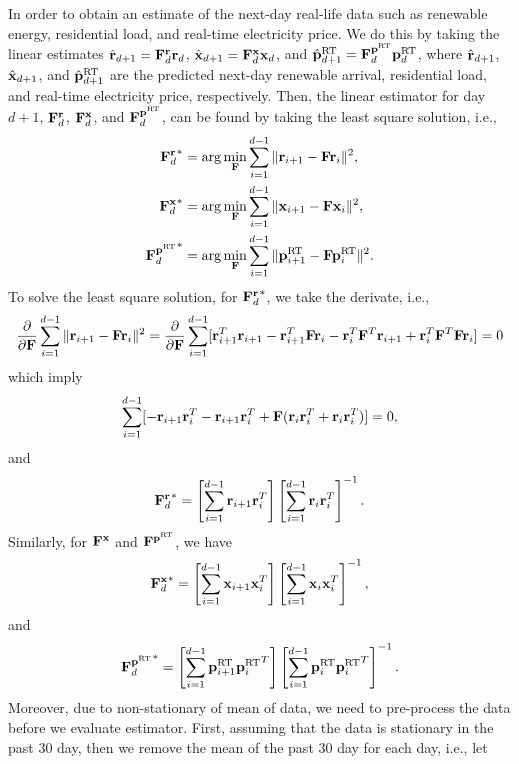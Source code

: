 In order to obtain an estimate of the next-day real-life data such as renewable energy, residential load, and real-time electricity price. We do this by taking the linear estimates $\hat{{\mathbf r}}_{d+1}={\mathbf F}^{{\mathbf r}}_d{\mathbf r}_d$, $\hat{{\mathbf x}}_{d+1}={\mathbf F}^{{\mathbf x}}_d{\mathbf x}_d$, and $\hat{{\mathbf p}}^{\text{RT}}_{d+1}={\mathbf F}^{{\mathbf p}^{\text{RT}}}_d{\mathbf p}^{\text{RT}}_d$, where $\hat{{\mathbf r}}_{d+1}$, $\hat{{\mathbf x}}_{d+1}$, and $\hat{{\mathbf p}}^{\text{RT}}_{d+1}$ are the predicted next-day renewable arrival, residential load, and real-time electricity price, respectively. Then, the linear estimator for day $d+1$, ${\mathbf F}^{\mathbf r}_d$, ${\mathbf F}^{\mathbf x}_d$, and ${\mathbf F}^{{\mathbf p}^{\text{RT}}}_d$, can be found by taking the least square solution, i.e.,
\begin{align}
    {{\mathbf F}^{\mathbf r}_d}^* &= \arg\min_{{\mathbf F}} \sum_{i=1}^{d-1} \|{\mathbf r}_{i+1} - {\mathbf F} {\mathbf r}_{i}\|^2, \\
    {{\mathbf F}^{\mathbf x}_d}^* &= \arg\min_{{\mathbf F}} \sum_{i=1}^{d-1} \|{\mathbf x}_{i+1} - {\mathbf F} {\mathbf x}_{i}\|^2, \\
    {{\mathbf F}^{{\mathbf p}^{\text{RT}}}_d}^* &= \arg\min_{{\mathbf F}} \sum_{i=1}^{d-1} \|{\mathbf p}^{\text{RT}}_{i+1} - {\mathbf F} {\mathbf p}^{\text{RT}}_{i}\|^2.
\end{align}
To solve the least square solution, for ${{\mathbf F}^{\mathbf r}_d}^*$, we take the derivate, i.e.,
\begin{equation}
    \frac{\partial}{\partial {\mathbf F}} \sum_{i=1}^{d-1} \|{\mathbf r}_{i+1} - {\mathbf F} {\mathbf r}_i\|^2 = \frac{\partial}{\partial {\mathbf F}} \sum_{i=1}^{d-1} [{\mathbf r}_{i+1}^T{\mathbf r}_{i+1} - {\mathbf r}_{i+1}^T{\mathbf F}{\mathbf r}_i - {\mathbf r}_i^T{\mathbf F}^T{\mathbf r}_{i+1} + {\mathbf r}_i^T{\mathbf F}^T{\mathbf F}{\mathbf r}_i] = 0
\end{equation}
which imply
\begin{equation}
    \sum_{i=1}^{d-1}[-{\mathbf r}_{i+1}{\mathbf r}_i^T-{\mathbf r}_{i+1}{\mathbf r}_i^T + {\mathbf F}({\mathbf r}_i {\mathbf r}_i^T+{\mathbf r}_i {\mathbf r}_i^T)] = 0,
\end{equation}
and
\begin{equation}
    {{\mathbf F}^{\mathbf r}_d}^* = \left[\sum_{i=1}^{d-1}{\mathbf r}_{i+1}{\mathbf r}_i^T\right]\left[\sum_{i=1}^{d-1}{\mathbf r}_i{\mathbf r}_i^T\right]^{-1}.
\end{equation}
Similarly, for ${\mathbf F}^{\mathbf x}$ and ${\mathbf F}^{{\mathbf p}^{\text{RT}}}$, we have
\begin{equation}
    {{\mathbf F}^{\mathbf x}_d}^* = \left[\sum_{i=1}^{d-1}{\mathbf x}_{i+1}{\mathbf x}_i^T\right]\left[\sum_{i=1}^{d-1}{\mathbf x}_i{\mathbf x}_i^T\right]^{-1},
\end{equation}
and
\begin{equation}
    {{\mathbf F}^{{\mathbf p}^{\text{RT}}}_d}^* = \left[\sum_{i=1}^{d-1}{\mathbf p}^{\text{RT}}_{i+1}{{\mathbf p}^{\text{RT}}_i}^T\right]\left[\sum_{i=1}^{d-1}{\mathbf p}^{\text{RT}}_i{{\mathbf p}^{\text{RT}}_i}^T\right]^{-1}.
\end{equation}
Moreover, due to non-stationary of mean of data, we need to pre-process the data before we evaluate estimator. First, assuming that the data is stationary in the past $30$ day, then we remove the mean of the past $30$ day for each day, i.e., let
